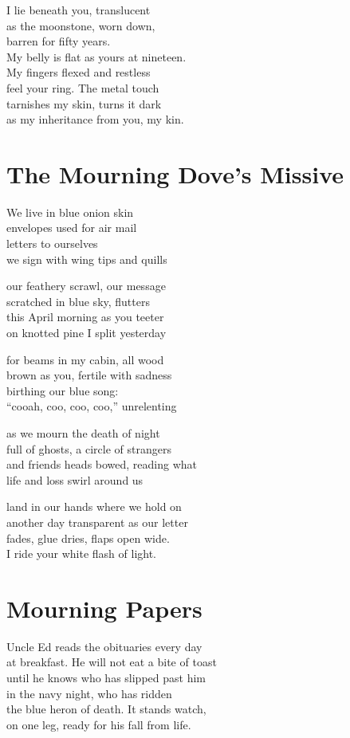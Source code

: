 \documentclass[twoside,10pt]{book}
\begin{document}
I lie beneath you, translucent\\
as the moonstone, worn down,\\
barren for fifty years.\\
My belly is flat as yours at nineteen.\\
My fingers flexed and restless\\
feel your ring. The metal touch\\
tarnishes my skin, turns it dark\\
as my inheritance from you, my kin.


\clearpage
\section{The Mourning Dove's Missive}

We live in blue onion skin\\
envelopes used for air mail\\
letters to ourselves\\
we sign with wing tips and quills

our feathery scrawl, our message\\
scratched in blue sky, flutters\\
this April morning as you teeter\\
on knotted pine I split yesterday

for beams in my cabin, all wood\\
brown as you, fertile with sadness\\
birthing our blue song:\\
``cooah, coo, coo, coo,'' unrelenting

as we mourn the death of night\\
full of ghosts, a circle of strangers\\
and friends heads bowed, reading what\\
life and loss swirl around us

land in our hands where we hold on\\
another day transparent as our letter\\
fades, glue dries, flaps open wide.\\
I ride your white flash of light.


\clearpage
\section{Mourning Papers}

Uncle Ed reads the obituaries every day\\
at breakfast. He will not eat a bite of toast\\
until he knows who has slipped past him\\
in the navy night, who has ridden\\
the blue heron of death. It stands watch,\\
on one leg, ready for his fall from life.
\end{document}
